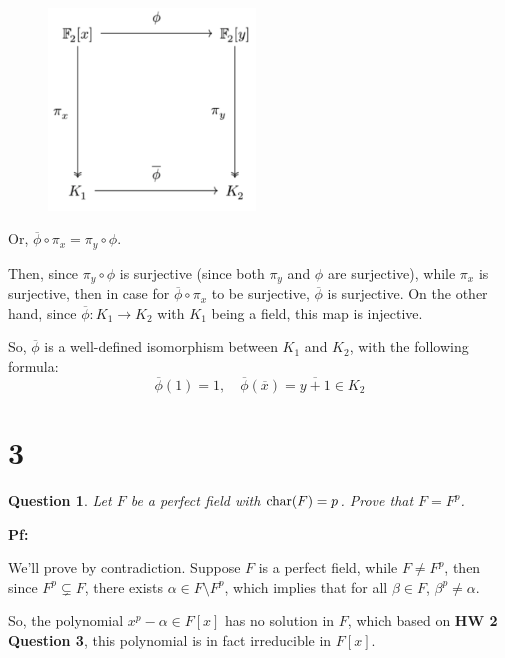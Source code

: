 \documentclass{article}
\newtheorem{question}{Question}
\begin{document}
\begin{figure}[h!]
    \begin{center}
        \includegraphics*[width=55mm]{commute.png}
    \end{center}
\end{figure}

Or, $\overline{\phi}\circ \pi_x = \pi_y\circ \phi$.

Then, since $\pi_y\circ\phi$ is surjective (since both $\pi_y$ and $\phi$ are surjective), while $\pi_x$ is surjective, then in case for $\overline{\phi}\circ \pi_x$ to be surjective, $\overline{\phi}$ is surjective. On the other hand, since $\overline{\phi}:K_1\rightarrow K_2$ with $K_1$ being a field, this map is injective. 

So, $\overline{\phi}$ is a well-defined isomorphism between $K_1$ and $K_2$, with the following formula:
$$\overline{\phi}(1)=1,\quad \overline{\phi}(\overline{x}) = \overline{y+1}\in K_2$$

\break

\section*{3}
\begin{myBox}[]{}
    \begin{question}
        Let $F$ be a perfect field with $\textmd{char}(F)=p$. Prove that $F=F^p$.
    \end{question}
\end{myBox}

\textbf{Pf:}

We'll prove by contradiction. Suppose $F$ is a perfect field, while $F\neq F^p$, then since $F^p\subsetneq F$, there exists $\alpha\in F\setminus F^p$, which implies that for all $\beta\in F$, $\beta^p\neq \alpha$.

So, the polynomial $x^p-\alpha \in F[x]$ has no solution in $F$, which based on \textbf{HW 2 Question 3}, this polynomial is in fact irreducible in $F[x]$.
\end{document}
